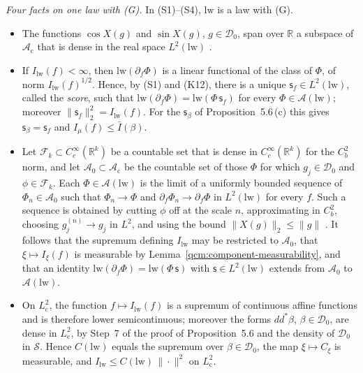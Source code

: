 \documentclass[11pt,letterpaper,reqno]{amsart}
\theoremstyle{definition}
\begin{document}
\emph{Four facts on one law with (G).}
In (S1)--(S4), $\mathrm{lw}$ is a law with (G).
\begin{itemize}
\item[(S1)] The functions $\cos X(g)$ and $\sin X(g)$, $g\in\mathcal D_0$, span over $\mathbb R$ a subspace of $\mathcal A_{\mathrm c}$ that is dense in the real space $L^2(\mathrm{lw})$ \cite[Section~5]{ErgodicComponents}.
\item[(S2)] If $I_{\mathrm{lw}}(f)<\infty$, then $\mathrm{lw}(\partial_f\Phi)$ is a linear functional of the class of $\Phi$, of norm $I_{\mathrm{lw}}(f)^{1/2}$.
Hence, by (S1) and (K12), there is a unique $\mathsf s_f\in L^2(\mathrm{lw})$, called the \emph{score}, such that $\mathrm{lw}(\partial_f\Phi)=\mathrm{lw}(\Phi\,\mathsf s_f)$ for every $\Phi\in\mathcal A(\mathrm{lw})$;
moreover $\|\mathsf s_f\|_2^2=I_{\mathrm{lw}}(f)$.
For the $\mathsf s_\beta$ of Proposition~5.6\,(c) this gives $\mathsf s_\beta=\mathsf s_f$ and $I_\mu(f)\le\bar I(\beta)$.
\item[(S3)] Let $\mathcal F_k\subset C_c^\infty(\mathbb R^k)$ be a countable set that is dense in $C_c^\infty(\mathbb R^k)$ for the $C_b^2$ norm, and let $\mathcal A_0\subset\mathcal A_{\mathrm c}$ be the countable set of those $\Phi$ for which $g_j\in\mathcal D_0$ and $\phi\in\mathcal F_k$.
Each $\Phi\in\mathcal A(\mathrm{lw})$ is the limit of a uniformly bounded sequence of $\Phi_n\in\mathcal A_0$ such that $\Phi_n\to\Phi$ and $\partial_f\Phi_n\to\partial_f\Phi$ in $L^2(\mathrm{lw})$ for every $f$.
Such a sequence is obtained by cutting $\phi$ off at the scale $n$, approximating in $C^2_b$, choosing $g^{(n)}_j\to g_j$ in $L^2$, and using the bound $\|X(g)\|_2\le\|g\|$ \cite[Proposition~5.1]{QEDConstruction}.
It follows that the supremum defining $I_{\mathrm{lw}}$ may be restricted to $\mathcal A_0$, that $\xi\mapsto I_\xi(f)$ is measurable by Lemma~\ref{qcm:component-measurability}, and that an identity $\mathrm{lw}(\partial_f\Phi)=\mathrm{lw}(\Phi\,\mathsf s)$ with $\mathsf s\in L^2(\mathrm{lw})$ extends from $\mathcal A_0$ to $\mathcal A(\mathrm{lw})$.
\item[(S4)] On $L^2_{\mathrm c}$, the function $f\mapsto I_{\mathrm{lw}}(f)$ is a supremum of continuous affine functions and is therefore lower semicontinuous;
moreover the forms $dd^*\beta$, $\beta\in\mathcal D_0$, are dense in $L^2_{\mathrm c}$, by Step~7 of the proof of Proposition~5.6 and the density of $\mathcal D_0$ in $\mathcal S$.
Hence $C(\mathrm{lw})$ equals the supremum over $\beta\in\mathcal D_0$, the map $\xi\mapsto C_\xi$ is measurable, and $I_{\mathrm{lw}}\le C(\mathrm{lw})\,\|\cdot\|^2$ on $L^2_{\mathrm c}$.
\end{itemize}
\end{document}
